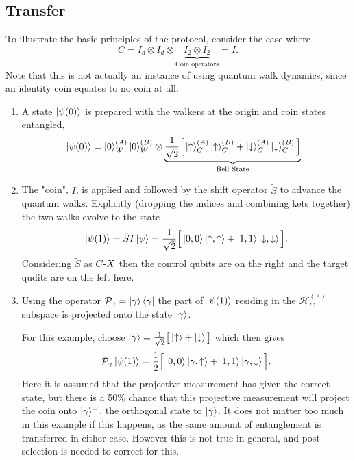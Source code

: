 \subsection{Transfer}
\label{subsection:qw_transfer}
To illustrate the basic principles of the protocol, consider the case where 
\begin{equation}
    C = I_d \otimes I_d \otimes \underbrace{I_2 \otimes I_2}_{\text{Coin operators}} = I.
\end{equation}
Note that this is not actually an instance of using quantum walk dynamics, since an identity coin equates to no coin at all.

\begin{enumerate}
    \item A state $\ket{\psi(0)}$ is prepared with the walkers at the origin and coin states entangled,
    \begin{equation}
        \ket{\psi(0)} = \ket{0}^{(A)}_W\ket{0}^{(B)}_W \otimes \underbrace{\frac{1}{\sqrt{2}}\Big [\ket{\uparrow}^{(A)}_C\ket{\uparrow}^{(B)}_C + \ket{\downarrow}^{(A)}_C\ket{\downarrow}^{(B)}_C \Big]}_{\text{Bell State}}.
    \end{equation}
    \item The "coin", $I$, is applied and followed by the shift operator $\tilde{S}$ to advance the quantum walks.
    Explicitly (dropping the indices and combining kets together) the two walks evolve to the state
    \begin{equation}
        \ket{\psi(1)} = \tilde{S}I\ket{\psi} = \frac{1}{\sqrt{2}}\Big [\ket{0,0}\ket{\uparrow,\uparrow} + \ket{1,1}\ket{\downarrow,\downarrow}\Big].
    \end{equation}
    Considering $\tilde{S}$ as $C\text{-}X$ then the control qubits are on the right and the target qudits are on the left here.
    \item Using the operator $\mathcal{P}_{\gamma} = \ket{\gamma}\bra{\gamma}$ the part of $\ket{\psi(1)}$ residing in the $\mathcal{H}^{(A)}_C$ subspace is projected onto the state $\ket{\gamma}$.
    
    For this example, choose $\ket{\gamma} = \frac{1}{\sqrt{2}} \big [\ket{\uparrow} + \ket{\downarrow} \big]$ which then gives
    \begin{equation}
        \mathcal{P}_\gamma \ket{\psi(1)} = \frac{1}{2}\Big [\ket{0, 0}\ket{\gamma,\uparrow} + \ket{1, 1}\ket{\gamma, \downarrow}\Big ].
    \end{equation}
    Here it is assumed that the projective measurement has given the correct state, but there is a 50\% chance that this projective measurement will project the coin onto $\ket{\gamma}^{\perp}$, the orthogonal state to $\ket{\gamma}$.
    It does not matter too much in this example if this happens, as the same amount of entanglement is transferred in either case.
    However this is not true in general, and post selection is needed to correct for this.


\end{enumerate}
